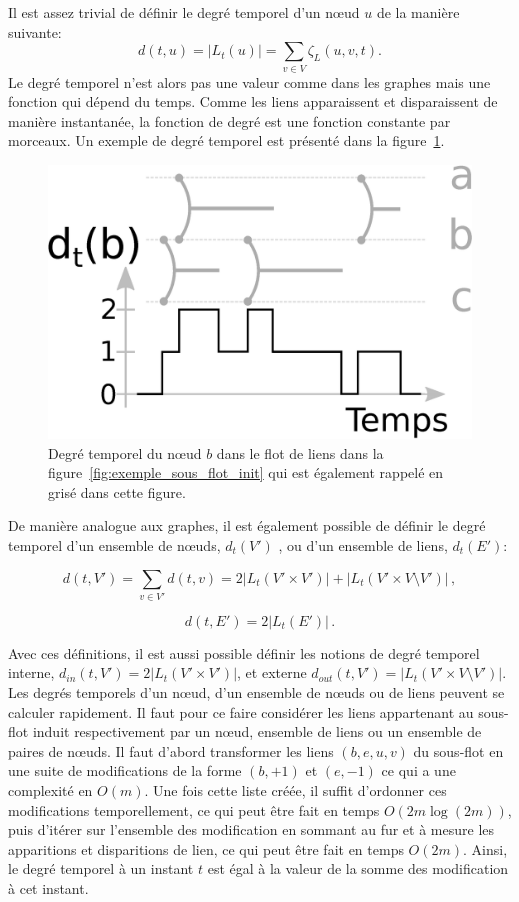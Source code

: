 Il est assez trivial de définir le degré temporel d'un n\oe{}ud $u$ de la manière suivante:
\begin{equation}
d(t,u)= |L_t(u)|= \sum_{v \in V} \zeta_{L}(u,v,t).
\end{equation}
Le degré temporel n'est alors pas une valeur comme dans les graphes mais une fonction qui dépend du temps.
Comme les liens apparaissent et disparaissent de manière instantanée, la fonction de degré est une fonction constante par morceaux.
Un exemple de degré temporel est présenté dans la figure~\ref{fig:exemple_degre}.

\begin{figure}
\centering
\includegraphics[width=0.35\linewidth]{img/Intro/degre2.eps}
\caption{Degré temporel du n\oe{}ud $b$ dans le flot de liens dans la figure~\ref{fig:exemple_sous_flot_init} qui est également rappelé en grisé dans cette figure.
}
\label{fig:exemple_degre}
\end{figure}

De manière analogue aux graphes, il est également possible de définir le degré temporel d'un ensemble de n\oe{}uds, $d_t(V')$ , ou d'un ensemble de liens, $d_t(E')$:

\begin{equation}
d(t, V') = \sum_{v \in V'} d(t,v) = 2 |L_{t}(V'\times V')|+ |L_{t}(V'\times V \setminus V')|\,,
\end{equation}

\begin{equation}
d(t, E')=2|L_{t}(E')| \,.
\end{equation}

Avec ces définitions, il est aussi possible définir les notions de degré temporel interne, $d_{in}(t,V') = 2 |L_{t}(V'\times V')|$, et externe $d_{out}(t,V')=|L_{t}(V'\times V \setminus V')|$.
Les degrés temporels d'un n\oe{}ud, d'un ensemble de n\oe{}uds ou de liens peuvent se calculer rapidement.
Il faut pour ce faire considérer les liens appartenant au sous-flot induit respectivement par un n\oe{}ud, ensemble de liens ou un ensemble de paires de n\oe{}uds.
Il faut d'abord transformer les liens $(b,e,u,v)$ du sous-flot en une suite de modifications de la forme $(b,+1)$ et $(e,-1)$ ce qui a une complexité en $O(m)$.
Une fois cette liste créée, il suffit d'ordonner ces modifications temporellement, ce qui peut être fait en temps $O(2m\log(2m))$, puis d'itérer sur l'ensemble des modification en sommant au fur et à mesure les apparitions et disparitions de lien, ce qui peut être fait en temps $O(2m)$.
Ainsi, le degré temporel à un instant $t$ est égal à la valeur de la somme des modification à cet instant.
\bigskip

